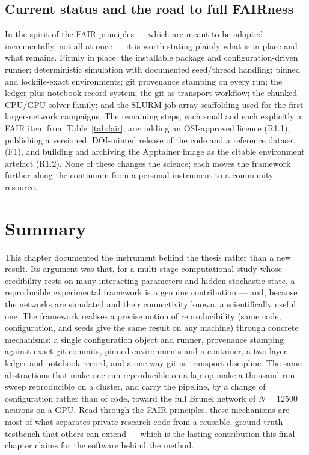 \documentclass[11pt,a4paper]{article}
\begin{document}
\subsection{Current status and the road to full FAIRness}
\label{sec:status}
In the spirit of the FAIR principles --- which are meant to be adopted incrementally, not all at
once --- it is worth stating plainly what is in place and what remains. Firmly in place: the
installable package and configuration-driven runner; deterministic simulation with documented
seed/thread handling; pinned and lockfile-exact environments; git provenance stamping on every
run; the ledger-plus-notebook record system; the git-as-transport workflow; the chunked CPU/GPU
solver family; and the SLURM job-array scaffolding used for the first larger-network campaigns.
The remaining steps, each small and each explicitly a FAIR item from Table~\ref{tab:fair}, are:
adding an OSI-approved licence (R1.1), publishing a versioned, DOI-minted release of the code and
a reference dataset (F1), and building and archiving the Apptainer image as the citable
environment artefact (R1.2). None of these changes the science; each moves the framework further
along the continuum from a personal instrument to a community resource.

\section{Summary}
\label{sec:summary}

This chapter documented the instrument behind the thesis rather than a new result. Its argument
was that, for a multi-stage computational study whose credibility rests on many interacting
parameters and hidden stochastic state, a reproducible experimental framework is a genuine
contribution --- and, because the networks are simulated and their connectivity known, a
scientifically useful one. The framework realises a precise notion of reproducibility (same code,
configuration, and seeds give the same result on any machine) through concrete mechanisms:
a single configuration object and runner, provenance stamping against exact git commits, pinned
environments and a container, a two-layer ledger-and-notebook record, and a one-way
git-as-transport discipline. The same abstractions that make one run reproducible on a laptop
make a thousand-run sweep reproducible on a cluster, and carry the pipeline, by a change of
configuration rather than of code, toward the full Brunel network of $N=12500$ neurons on a GPU.
Read through the FAIR principles, these mechanisms are most of what separates private research
code from a reusable, ground-truth testbench that others can extend --- which is the lasting
contribution this final chapter claims for the software behind the method.
\end{document}
